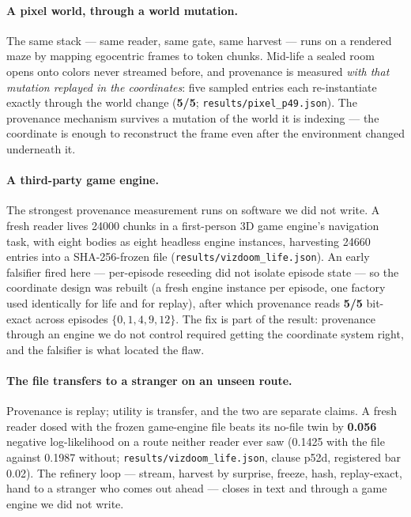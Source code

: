 \documentclass[11pt]{article}
\theoremstyle{definition}
\newcommand{\code}[1]{\texttt{#1}}
\begin{document}
\paragraph{A pixel world, through a world mutation.} The same stack --- same
reader, same gate, same harvest --- runs on a rendered maze by mapping
egocentric frames to token chunks. Mid-life a sealed room opens onto colors
never streamed before, and provenance is measured \emph{with that mutation
replayed in the coordinates}: five sampled entries each re-instantiate exactly
through the world change (\textbf{5/5};
\code{results/pixel\_p49.json}). The provenance mechanism survives a mutation
of the world it is indexing --- the coordinate is enough to reconstruct the
frame even after the environment changed underneath it.

\paragraph{A third-party game engine.} The strongest provenance measurement
runs on software we did not write. A fresh reader lives \num{24000} chunks in a
first-person 3D game engine's navigation task, with eight bodies as eight
headless engine instances, harvesting \num{24660} entries into a
SHA-256-frozen file (\code{results/vizdoom\_life.json}). An early falsifier
fired here --- per-episode reseeding did not isolate episode state --- so the
coordinate design was rebuilt (a fresh engine instance per episode, one
factory used identically for life and for replay), after which provenance
reads \textbf{5/5} bit-exact across episodes $\{0,1,4,9,12\}$. The fix is part
of the result: provenance through an engine we do not control required getting
the coordinate system right, and the falsifier is what located the flaw.

\paragraph{The file transfers to a stranger on an unseen route.} Provenance is
replay; utility is transfer, and the two are separate claims. A fresh reader
dosed with the frozen game-engine file beats its no-file twin by
\textbf{\num{0.056}} negative log-likelihood on a route neither reader ever saw
(\num{0.1425} with the file against \num{0.1987} without;
\code{results/vizdoom\_life.json}, clause p52d, registered bar \num{0.02}). The
refinery loop --- stream, harvest by surprise, freeze, hash, replay-exact, hand
to a stranger who comes out ahead --- closes in text and through a game engine
we did not write.
\end{document}
